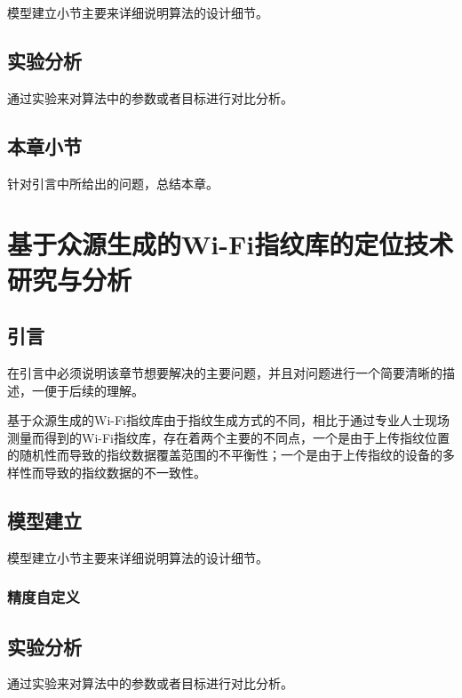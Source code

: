 模型建立小节主要来详细说明算法的设计细节。

\section{实验分析}

通过实验来对算法中的参数或者目标进行对比分析。

\section{本章小节}

针对引言中所给出的问题，总结本章。




\chapter{基于众源生成的Wi-Fi指纹库的定位技术研究与分析}

\section{引言}

在引言中必须说明该章节想要解决的主要问题，并且对问题进行一个简要清晰的描述，一便于后续的理解\cite{montoliu2017indoorloc}。

基于众源生成的Wi-Fi指纹库由于指纹生成方式的不同，相比于通过专业人士现场测量而得到的Wi-Fi指纹库，存在着两个主要的不同点，一个是由于上传指纹位置的随机性而导致的指纹数据覆盖范围的不平衡性；一个是由于上传指纹的设备的多样性而导致的指纹数据的不一致性。

\section{模型建立}

模型建立小节主要来详细说明算法的设计细节。

\subsection{精度自定义}



\section{实验分析}

通过实验来对算法中的参数或者目标进行对比分析。

